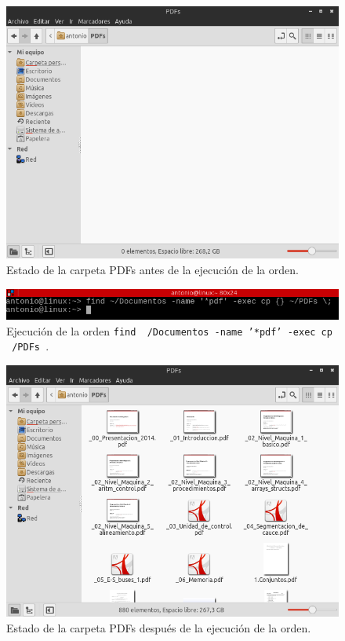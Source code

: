 \begin{figure}[H]
    \begin{center}
        \includegraphics[scale=0.5]{imagenes/img46}
        \caption{Estado de la carpeta PDFs antes de la ejecución de la orden.}
        \label{fig43}
    \end{center}
\end{figure}

\begin{figure}[H]
    \begin{center}
        \includegraphics[scale=0.6]{imagenes/img47}
        \caption{Ejecución de la orden  \texttt{find ~/Documentos -name '*pdf' -exec cp {} ~/PDFs \;}. }
        \label{fig44}
    \end{center}
\end{figure}

\begin{figure}[H]
    \begin{center}
        \includegraphics[scale=0.5]{imagenes/img48}
        \caption{Estado de la carpeta PDFs después de la ejecución de la orden.}
        \label{fig45}
    \end{center}
\end{figure}


